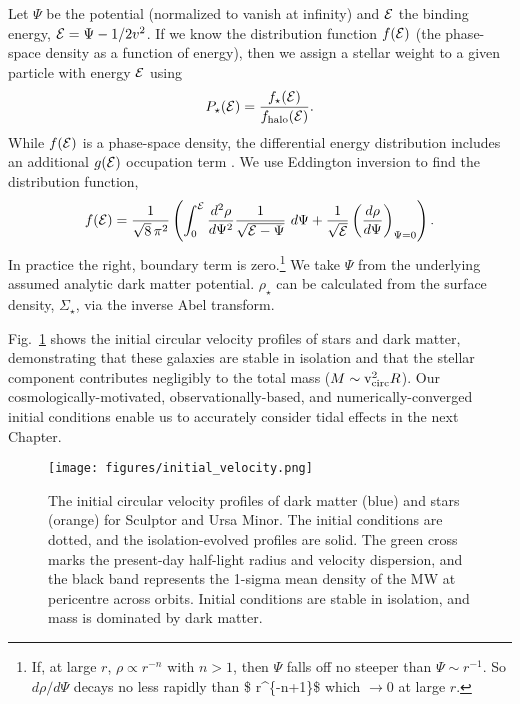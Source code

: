 Let \(\Psi\) be the potential (normalized to vanish at infinity) and
\({\cal E}\) the binding energy, \({\cal E} = \Psi - 1/2 v^2\). If we
know the distribution function \(f({\cal E})\) (the phase-space density
as a function of energy), then we assign a stellar weight to a given
particle with energy \({\cal E}\) using \begin{equation}{
P_\star({\cal E}) = \frac{f_\star({\cal E})}{f_{\rm halo}({\cal E})}.
}\end{equation} While \(f({\cal E})\) is a phase-space density, the
differential energy distribution includes an additional \(g({\cal E})\)
occupation term \citep{BT1987}. We use Eddington inversion to find the
distribution function, \citep[eq. 4-140b in][]{BT1987} \begin{equation}{
f({\cal E}) = \frac{1}{\sqrt{8}\, \pi^2}\left( \int_0^{\cal E} \frac{d^2\rho}{d\Psi^2} \frac{1}{\sqrt{{\cal E} - \Psi}}\ d\Psi + \frac{1}{\sqrt{\cal E}} \left(\frac{d\rho}{d\Psi}\right)_{\Psi=0} \right).
}\end{equation} In practice the right, boundary term is zero.\footnote{If,
  at large \(r\), \(\rho \propto r^{-n}\) with \(n>1\), then \(\Psi\)
  falls off no steeper than \(\Psi \sim r^{-1}\). So \(d\rho / d\Psi\)
  decays no less rapidly than \$ r\^{}\{-n+1\}\$ which \(\rightarrow0\)
  at large \(r\).} We take \(\Psi\) from the underlying assumed analytic
dark matter potential. \(\rho_\star\) can be calculated from the surface
density, \(\Sigma_\star\), via the inverse Abel transform.

Fig.~\ref{fig:scl_umi_initial_isolation} shows the initial circular
velocity profiles of stars and dark matter, demonstrating that these
galaxies are stable in isolation and that the stellar component
contributes negligibly to the total mass (\(M \sim {\rm v}_{\rm circ}^2 R\)).
Our cosmologically-motivated, observationally-based, and
numerically-converged initial conditions enable us to accurately
consider tidal effects in the next Chapter.

\begin{figure}
\centering
\texttt{[image: figures/initial\_velocity.png]}
\caption[Initial halo velocity profiles]{The initial circular velocity
profiles of dark matter (blue) and stars (orange) for Sculptor and Ursa
Minor. The initial conditions are dotted, and the isolation-evolved
profiles are solid. The green cross marks the present-day half-light
radius and velocity dispersion, and the black band represents the
1-sigma mean density of the MW at pericentre across orbits. Initial
conditions are stable in isolation, and mass is dominated by dark
matter.}\label{fig:scl_umi_initial_isolation}
\end{figure}
